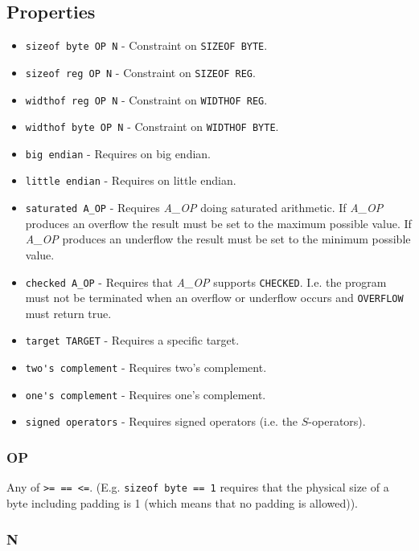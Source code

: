 \subsection{Properties}

\begin{itemize}
	\item \verb|sizeof byte OP N| - Constraint on \verb|SIZEOF BYTE|. 
	\item \verb|sizeof reg OP N| - Constraint on \verb|SIZEOF REG|. 
	\item \verb|widthof reg OP N| - Constraint on \verb|WIDTHOF REG|.
	\item \verb|widthof byte OP N| - Constraint on \verb|WIDTHOF BYTE|.
	\item \verb|big endian| - Requires on big endian.
	\item \verb|little endian| - Requires on little endian.
	\item \verb|saturated A_OP| - Requires \emph{A\_OP} doing saturated arithmetic. If \emph{A\_OP} produces an overflow the result must be set
					to the maximum possible value. If \emph{A\_OP} produces an underflow the result must be set to the
					minimum possible value.
	\item \verb|checked A_OP| - Requires that \emph{A\_OP} supports \verb|CHECKED|. I.e. the program must not be terminated when an overflow or underflow
					occurs and \verb|OVERFLOW| must return true.
	\item \verb|target TARGET| - Requires a specific target.
	\item \verb|two's complement| - Requires two's complement.
	\item \verb|one's complement| - Requires one's complement.
	\item \verb|signed operators| - Requires signed operators (i.e. the $S$-operators). 
\end{itemize}

\subsubsection{OP}

Any of \verb|>= == <=|. (E.g. \verb|sizeof byte == 1| requires that the physical size of a byte including padding is 1 (which means that no padding is allowed)).

\subsubsection{N}

